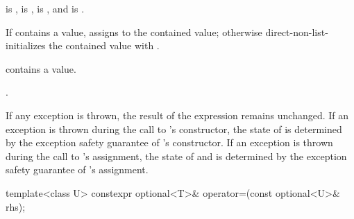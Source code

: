 \begin{itemdescr}
\pnum
\constraints
{} is ,
 is ,
 is , and
 is .

\pnum
\effects
If  contains a value, assigns  to the contained value; otherwise direct-non-list-initializes the contained value with .

\pnum
\ensures
{} contains a value.

\pnum
\returns
{}.

\pnum
\remarks
If any exception is thrown, the result of the expression  remains unchanged. If an exception is thrown during the call to 's constructor, the state of  is determined by the exception safety guarantee of 's constructor. If an exception is thrown during the call to 's assignment, the state of  and  is determined by the exception safety guarantee of 's assignment.
\end{itemdescr}

%
\begin{itemdecl}
template<class U> constexpr optional<T>& operator=(const optional<U>& rhs);
\end{itemdecl}

